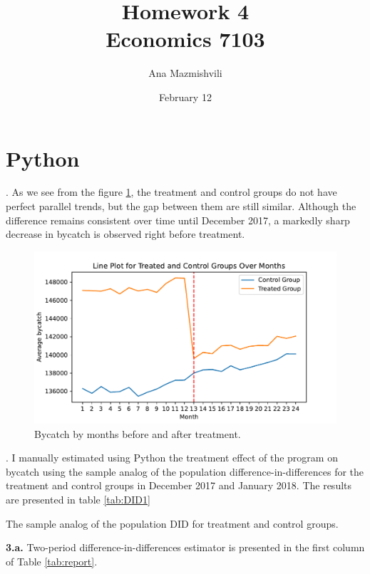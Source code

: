 \documentclass{article}
\title{Homework 4 \\ Economics 7103}
\author{Ana Mazmishvili}
\date{February 12}
\begin{document}
  
\maketitle

\section{Python}

. As we see from the figure \ref{fig:trend}, the treatment and control groups do not have perfect parallel trends, but the gap between them are still similar. Although the difference remains consistent over time until December 2017, a markedly sharp decrease in bycatch is observed right before treatment.

\begin{figure}[h]
    \centering
    \includegraphics{homework 4/output/figure/trend1.pdf}
    \caption{ Bycatch by months before and after treatment. }
    \label{fig:trend}
\end{figure}

\FloatBarrier

. I manually estimated using Python the treatment effect of the program on bycatch using the sample analog of the population difference-in-differences for the treatment and control groups in December 2017 and January 2018. The results are presented in table \ref{tab:DID1}

\begin{table}[h]
    \centering
    
    \caption{The sample analog of the population DID for treatment and control groups.}
    \label{tab:DID1}
\end{table}

\FloatBarrier

\noindent \textbf{3.a. } Two-period difference-in-differences estimator is presented in the first column of Table \ref{tab:report}. 
\end{document}
